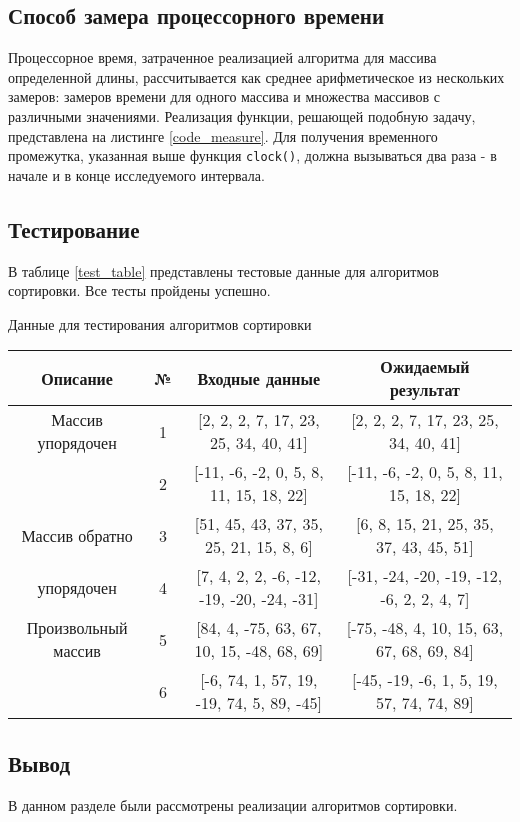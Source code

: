 \subsection{Способ замера процессорного времени}
Процессорное время, затраченное реализацией алгоритма для массива определенной
длины, рассчитывается как среднее арифметическое из нескольких замеров: 
замеров времени для одного массива и множества массивов с различными значениями.
Реализация функции, решающей подобную задачу, представлена на листинге
\ref{code_measure}. Для получения временного промежутка, указанная выше функция
\verb+clock()+, должна вызываться два раза - в начале и в конце исследуемого
интервала.


\pagebreak

\subsection{Тестирование}
В таблице \ref{test_table} представлены тестовые данные для алгоритмов
сортировки. Все тесты пройдены успешно.

\begin{center}
    \begin{threeparttable}[h]
        \caption{Данные для тестирования алгоритмов сортировки}
        \label{test_table}
        \centering
        \footnotesize
        \begin{tabular}{| c | c | c | c |}
            \hline
            Описание            & № & Входные данные                            & Ожидаемый результат                       \\ \hline
            Массив упорядочен   & 1 & [2, 2, 2, 7, 17, 23, 25, 34, 40, 41]      & [2, 2, 2, 7, 17, 23, 25, 34, 40, 41]      \\
                                & 2 & [-11, -6, -2, 0, 5, 8, 11, 15, 18, 22]    & [-11, -6, -2, 0, 5, 8, 11, 15, 18, 22]    \\ \hline
            Массив обратно      & 3 & [51, 45, 43, 37, 35, 25, 21, 15, 8, 6]    & [6, 8, 15, 21, 25, 35, 37, 43, 45, 51]    \\
            упорядочен          & 4 & [7, 4, 2, 2, -6, -12, -19, -20, -24, -31] & [-31, -24, -20, -19, -12, -6, 2, 2, 4, 7] \\ \hline
            Произвольный массив & 5 & [84, 4, -75, 63, 67, 10, 15, -48, 68, 69] & [-75, -48, 4, 10, 15, 63, 67, 68, 69, 84] \\
                                & 6 & [-6, 74, 1, 57, 19, -19, 74, 5, 89, -45]  & [-45, -19, -6, 1, 5, 19, 57, 74, 74, 89]  \\ \hline
        \end{tabular}
    \end{threeparttable}
\end{center}

\subsection*{Вывод}
В данном разделе были рассмотрены реализации алгоритмов сортировки.

\pagebreak

